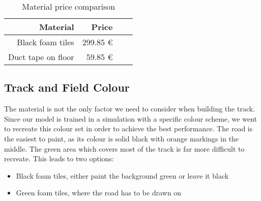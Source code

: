 \begin{table}
 \caption{Material price comparison}
 \label{tab:materials}
 \centering
 \setlength{\tabcolsep}{5mm}
 \def\arraystretch{1.25}
 \begin{tabular}{|r|r|c|c|}
 \hline
 \textbf{Material} & \textbf{Price} \\
 \hline\hline
 Black foam tiles & 299.85 € \\
 \hline
 Duct tape on floor & 59.85 € \\
 \hline
 \end{tabular}
 \end{table}

\subsection{Track and Field Colour}
The material is not the only factor we need to consider when building the track. Since our model is trained in a simulation with a specific colour scheme, we went to recreate this colour set in order to achieve the best performance. The road is the easiest to paint, as its colour is solid black with orange markings in the middle. The green area which covers most of the track is far more difficult to recreate. This leads to two options:
\begin{itemize}
    \item Black foam tiles, either paint the background green or leave it black
    \item Green foam tiles, where the road has to be drawn on
\end{itemize}
